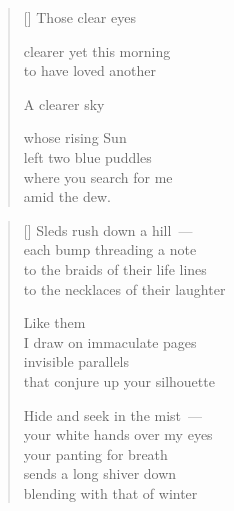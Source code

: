 \documentclass[14pt]{extbook}
\newcommand*{\centeredornament}{\centerline{\pgfornament[width=6cm]{88}}}
\begin{document}

\settowidth{\versewidth}{where you search for me}

\begin{verse}[\versewidth]
  Those clear eyes

  clearer yet this morning \\
  to have loved another

  A clearer sky

  whose rising Sun \\
  left two blue puddles \\
  where you search for me \\
  amid the dew.
\end{verse}


\newpage

\vspace*{-15mm}
\centeredornament
\vspace*{-7mm}


\settowidth{\versewidth}{to the necklaces of their laughter}

\begin{verse}[\versewidth]
  Sleds rush down a hill~--- \\
  each bump threading a note \\
  to the braids of their life lines \\
  to the necklaces of their laughter

  Like them \\
  I draw on immaculate pages \\
  invisible parallels \\
  that conjure up your silhouette

  Hide and seek in the mist~--- \\
  your white hands over my eyes \\
  your panting for breath \\
  sends a long shiver down \\
  blending with that of winter
\end{verse}

\newpage

\settowidth{\versewidth}{of a book open to the invisible}
\end{document}
